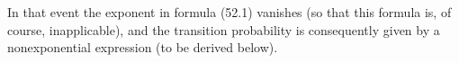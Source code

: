 In that event the exponent in formula (52.1) vanishes (so that this formula is, of course, inapplicable), and the transition probability is consequently given by a nonexponential expression (to be derived below).
